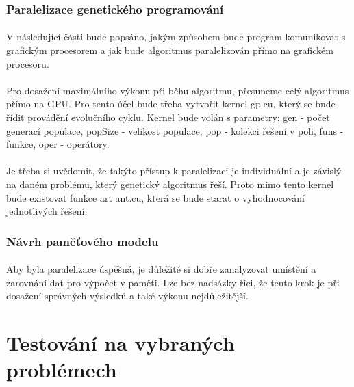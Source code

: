 \documentclass[bc,male,java,dept460]{diploma}		%
\begin{document}
\subsubsection{Paralelizace genetického programování}
\paragraph*{}
V následující části bude popsáno, jakým způsobem bude program komunikovat s grafickým procesorem a jak bude algoritmus paralelizován přímo na grafickém procesoru.

\paragraph*{}
Pro dosažení maximálního výkonu při běhu algoritmu, přesuneme celý algoritmus přímo na GPU. Pro tento účel bude třeba vytvořit kernel gp.cu, který se bude řídit provádění evolučního cyklu. Kernel bude volán s parametry: gen - počet generací populace, popSize - velikost populace, pop - kolekci řešení v poli, funs - funkce, oper - operátory.

\paragraph*{}
Je třeba si uvědomit, že takýto přístup k paralelizaci je individuální a je závislý na daném problému, který genetický algoritmus řeší. Proto mimo tento kernel bude existovat funkce art ant.cu, která se bude starat o vyhodnocování jednotlivých řešení.

\subsubsection{Návrh paměťového modelu}
\paragraph*{}
Aby byla paralelizace úspěšná, je důležité si dobře zanalyzovat umístění a zarovnání dat pro výpočet v paměti. Lze bez nadsázky říci, že tento krok je při dosažení správných výsledků a také výkonu nejdůležitější.



\section{Testování na vybraných problémech}
\end{document}
